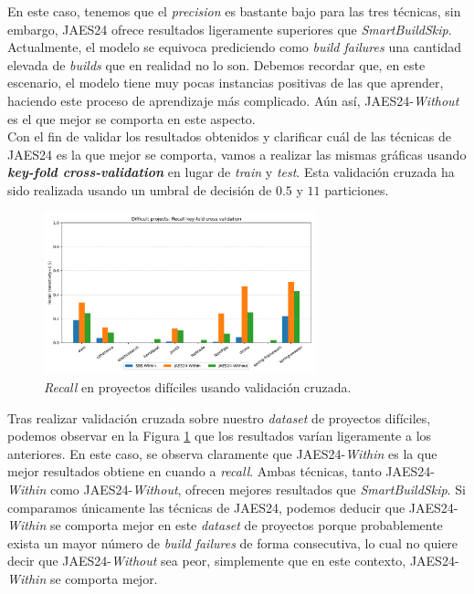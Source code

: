 En este caso, tenemos que el \textit{precision} es bastante bajo para las tres técnicas, sin
embargo, JAES24 ofrece resultados ligeramente superiores que \textit{SmartBuildSkip}.
Actualmente, el modelo se equivoca prediciendo como \textit{build failures} una cantidad elevada
de \textit{builds} que en realidad no lo son. Debemos recordar que, en este escenario, el modelo
tiene muy pocas instancias positivas de las que aprender, haciendo este proceso de aprendizaje
más complicado. Aún así, JAES24-\textit{Without} es el que mejor se comporta en este aspecto.\\

Con el fin de validar los resultados obtenidos y clarificar cuál de las técnicas de JAES24
es la que mejor se comporta, vamos a realizar las mismas gráficas usando \textbf{\textit{key-fold
cross-validation}} en lugar de \textit{train} y \textit{test}. Esta validación cruzada ha sido
realizada usando un umbral de decisión de $0.5$ y $11$ particiones.

\begin{figure}[H]
    \centering
    \includegraphics[width=0.7\textwidth]{images/Difficult projects: Recall key-fold cross validation.pdf}
    \caption{\textit{Recall} en proyectos difíciles usando validación cruzada.}
    \label{fig:key-fold_recall_difficult_projects}
\end{figure}

Tras realizar validación cruzada sobre nuestro \textit{dataset} de proyectos difíciles, podemos
observar en la Figura \ref{fig:key-fold_recall_difficult_projects} que los resultados varían
ligeramente a los anteriores. En este caso, se observa claramente que JAES24-\textit{Within} es
la que mejor resultados obtiene en cuando a \textit{recall}. Ambas técnicas, tanto
JAES24-\textit{Within} como JAES24-\textit{Without}, ofrecen mejores resultados que
\textit{SmartBuildSkip}. Si comparamos únicamente las técnicas de JAES24, podemos deducir
que JAES24-\textit{Within} se comporta mejor en este \textit{dataset} de proyectos porque
probablemente exista un mayor número de \textit{build failures} de forma consecutiva, lo cual no
quiere decir que JAES24-\textit{Without} sea peor, simplemente que en este contexto, JAES24-\textit{Within}
se comporta mejor.\\

